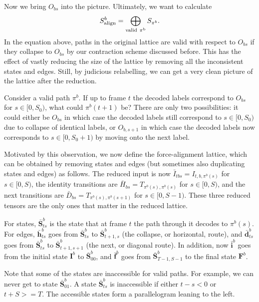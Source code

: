 \documentclass[a4paper]{article}
\begin{document}
Now we bring $O_{bs}$ into the picture. Ultimately, we want to calculate
\begin{equation}
S^b_{\rm{align}} = \bigoplus_{\rm{valid~}\pi^b}S_{\pi^b}.
\end{equation}
In the equation above, paths in the original lattice are valid with respect to $O_{bs}$ if they collapse to $O_{bs}$ by our contraction scheme discussed before. This has the effect of vastly reducing the size of the lattice by removing all the inconsistent states and edges. Still, by judicious relabelling, we can get a very clean picture of the lattice after the reduction.

Consider a valid path $\pi^b$. If up to frame $t$ the decoded labels correspond to $O_{bs}$ for $s\in [0, S_0)$, what could $\pi^b(t+1)$ be? There are only two possibilities: it could either be $O_{bs}$ in which case the decoded labels still correspond to $s\in [0, S_0)$ due to collapse of identical labels, or $O_{b,s+1}$ in which case the decoded labels now corresponds to $s\in [0, S_0+1)$ by moving onto the next label.

Motivated by this observation, we now define the force-alignment lattice, which can be obtained by removing states and edges (but sometimes also duplicating states and edges) as follows. The reduced input is now $\bar{I}_{tbs} = I_{t,b,\pi^b(s)}$ for $s \in [0, S)$, the identity transitions are $\bar{H}_{bs} = T_{\pi^b(s),\pi^b(s)}$ for $s \in [0, S)$, and the next transitions are $\bar{D}_{bs} = T_{\pi^b(s),\pi^b(s+1)}$ for $s \in [0, S-1)$. These three reduced tensors are the only ones that matter in the reduced lattice.

For states, $\bar{\mathbf{S}}^b_{ts}$ is the state that at frame $t$ the path through it decodes to $\pi^b(s)$. For edges, $\bar{\mathbf{h}}^b_{ts}$ goes from $\bar{\mathbf{S}}^b_{ts}$ to $\bar{\mathbf{S}}^b_{t+1,s}$ (the collapse, or horizontal, route), and $\bar{\mathbf{d}}^b_{ts}$ goes from $\bar{\mathbf{S}}^b_{ts}$ to $\bar{\mathbf{S}}^b_{t+1,s+1}$ (the next, or diagonal route). In addition, now $\bar{\mathbf{i}}^b$ goes from the initial state $\mathbf{I}^b$ to $\bar{\mathbf{S}}^b_{00}$, and $\bar{\mathbf{f}}^b$ goes from $\bar{\mathbf{S}}^b_{T-1, S-1}$ to the final state $\mathbf{F}^b$.

Note that some of the states are inaccessible for valid paths. For example, we can never get to state $\bar{\mathbf{S}}^b_{01}$. A state $\bar{\mathbf{S}}^b_{ts}$ is inaccessible if either $t-s<0$ or $t+S>=T$. The accessible states form a parallelogram leaning to the left.
\end{document}
